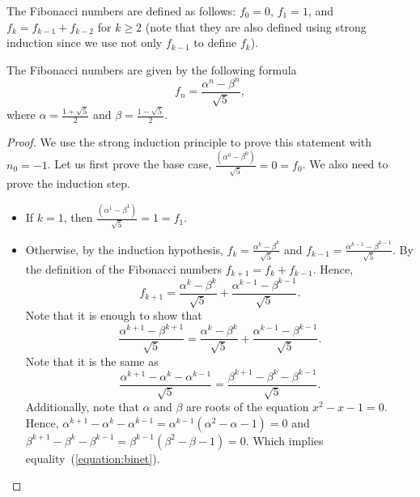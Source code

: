 The Fibonacci numbers are defined as follows:
$f_0 = 0$, $f_1 = 1$, and $f_k = f_{k - 1} + f_{k - 2}$ for $k \ge 2$ (note
that they are also defined using strong induction since we use not only
$f_{k - 1}$ to define $f_k$).
\begin{theorem}
    The Fibonacci numbers are given by the following formula
    \[
        f_n = \frac{\alpha^n - \beta^n}{\sqrt{5}},
    \]
    where $\alpha = \frac{1 + \sqrt{5}}{2}$ and
    $\beta = \frac{1 - \sqrt{5}}{2}$.
\end{theorem}
\begin{proof}
    We use the strong induction principle to prove this statement with $n_0 = -1$.
    Let us first prove the base case,
    $\frac{(\alpha^0 - \beta^0)}{\sqrt{5}} = 0 = f_0$.
    We also need to prove the induction step.
    \begin{itemize}
        \item If $k = 1$, then $\frac{(\alpha^1 - \beta^1)}{\sqrt{5}} = 1 = f_1$.
        \item Otherwise, by the induction hypothesis,
            $f_k = \frac{\alpha^k - \beta^k}{\sqrt{5}}$ and
            $f_{k - 1} = \frac{\alpha^{k - 1} - \beta^{k - 1}}{\sqrt{5}}$.
            By the definition of the Fibonacci numbers $f_{k + 1} = f_k + f_{k - 1}$.
            Hence,
            \[
                f_{k + 1} = \frac{\alpha^k - \beta^k}{\sqrt{5}} +
                \frac{\alpha^{k - 1} - \beta^{k - 1}}{\sqrt{5}}.
            \]
            Note that it is enough to show that
            \begin{equation}
            \label{equation:binet}
                \frac{\alpha^{k + 1} - \beta^{k + 1}}{\sqrt{5}} =
                \frac{\alpha^k - \beta^k}{\sqrt{5}} +
                \frac{\alpha^{k - 1} - \beta^{k - 1}}{\sqrt{5}}.
            \end{equation}
            Note that it is the same as
            \[
                \frac{\alpha^{k + 1} - \alpha^k - \alpha^{k - 1}}{\sqrt{5}} =
                \frac{\beta^{k + 1} - \beta^k - \beta^{k - 1}}{\sqrt{5}}.
            \]
            Additionally, note that $\alpha$ and $\beta$ are roots of the equation
            $x^2 - x - 1 = 0$. Hence,
            $\alpha^{k + 1} - \alpha^k - \alpha^{k - 1} = \alpha^{k - 1}(\alpha^2 -
            \alpha - 1) = 0$ and
            $\beta^{k + 1} - \beta^k - \beta^{k - 1} =
            \beta^{k - 1}(\beta^2 - \beta - 1) = 0$. Which implies
            equality~(\ref{equation:binet}).
    \end{itemize}
\end{proof}

